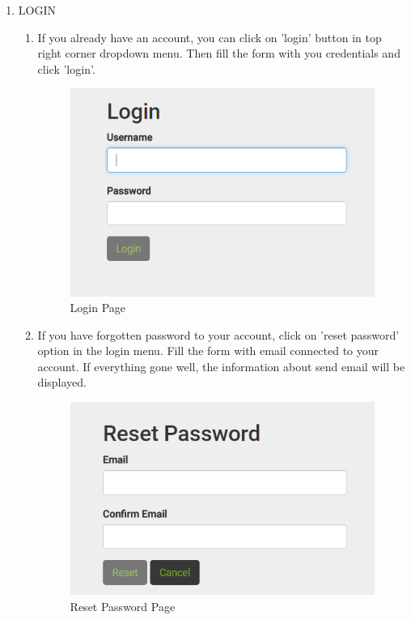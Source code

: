 \documentclass[a4paper,11pt,twoside]{report}
\theoremstyle{definition}
\begin{document}
\begin{enumerate}
\item LOGIN
\begin{enumerate}
\item If you already have an account, you can click on 'login' button in top right corner dropdown menu. Then fill the form with you credentials and click 'login'. 

\begin{figure}[h!]
\begin{center}
\includegraphics[width=\textwidth]{AS/login/1}
\end{center}
\caption{Login Page}
\end{figure}

\item If you have forgotten password to your account, click on 'reset password' option in the login menu.
Fill the form with email connected to your account. If everything gone well, the information about send email will be displayed.

\begin{figure}[h!]
\begin{center}
\includegraphics[width=\textwidth]{AS/login/4}
\end{center}
\caption{Reset Password Page}
\end{figure}


\end{enumerate}
\end{enumerate}
\end{document}
